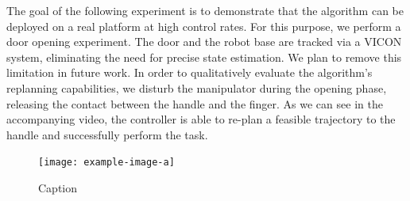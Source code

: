 The goal of the following experiment is to demonstrate that the algorithm can be deployed on a real platform at high control rates. For this purpose, we perform a door opening experiment. The door and the robot base are tracked via a VICON system, eliminating the need for precise state estimation. We plan to remove this limitation in future work. In order to qualitatively evaluate the algorithm's replanning capabilities, we disturb the manipulator during the opening phase, releasing the contact between the handle and the finger. As we can see in the accompanying video, the controller is able to re-plan a feasible trajectory to the handle and successfully perform the task. 

\begin{figure}[t]
    \centering
    \texttt{[image: example-image-a]}
    \caption{Caption}
    \label{fig:tank_experiment}
\end{figure}